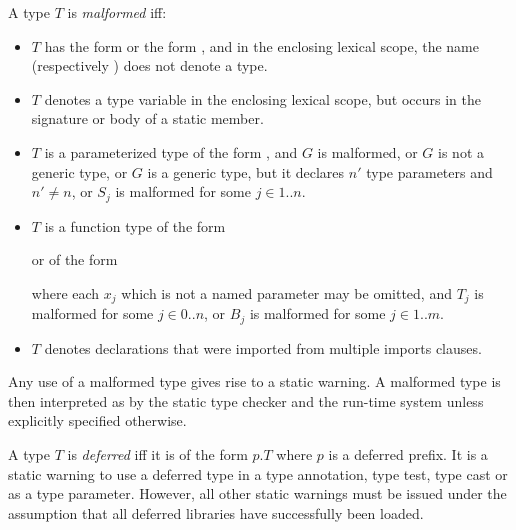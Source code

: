 \documentclass{article}
\begin{document}
\LMHash{}
A type $T$ is {\em malformed} if{}f:
\begin{itemize}
\item
  $T$ has the form \id{} or the form ,
  and in the enclosing lexical scope,
  the name \id{} (respectively ) does not denote a type.

\item
  $T$ denotes a type variable in the enclosing lexical scope,
  but occurs in the signature or body of a static member.

\item $T$ is a parameterized type of the form ,
  and $G$ is malformed,
  or $G$ is not a generic type,
  or $G$ is a generic type, but it declares $n'$ type parameters and $n' \not= n$,
  or $S_j$ is malformed for some $j \in 1 .. n$.

\item $T$ is a function type of the form



  \noindent
  or of the form



  \noindent
  where each $x_j$ which is not a named parameter may be omitted,
  and $T_j$ is malformed for some $j \in 0 .. n$,
  or $B_j$ is malformed for some $j \in 1 .. m$.

\item
  $T$ denotes declarations that were imported from multiple imports clauses.
\end{itemize}

\LMHash{}
Any use of a malformed type gives rise to a static warning.
A malformed type is then interpreted as \DYNAMIC{} by the static type checker and the run-time system unless explicitly specified otherwise.


\LMHash{}
A type $T$ is {\em deferred} if{}f it is of the form $p.T$ where $p$ is a deferred prefix.
It is a static warning to use a deferred type in a type annotation, type test, type cast or as a type parameter.
However, all other static warnings must be issued under the assumption that all deferred libraries have successfully been loaded.
\end{document}
